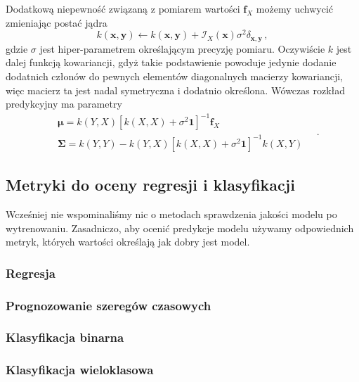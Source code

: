 \documentclass{myclass}
\numberwithin{equation}{section}
\begin{document}
Dodatkową niepewność związaną z pomiarem wartości \(\mathbf{f}_X\) możemy uchwycić zmieniając postać
jądra 
\begin{equation}
    k(\mathbf{x},\mathbf{y}) \leftarrow k(\mathbf{x},\mathbf{y}) + \mathcal{I}_X(\mathbf{x})\sigma^2\delta_{\mathbf{x},\mathbf{y}}\,,
\end{equation}
gdzie \(\sigma\) jest hiper-parametrem określającym precyzję pomiaru. Oczywiście \(k\) jest dalej
funkcją kowariancji, gdyż takie podstawienie powoduje jedynie dodanie dodatnich członów do pewnych
elementów diagonalnych macierzy kowariancji, więc macierz ta jest nadal symetryczna i dodatnio
określona. Wówczas rozkład predykcyjny ma parametry
\begin{equation}
    \begin{split}
        &\boldsymbol{\mu} = k(Y,X)\left[k(X,X) + \sigma^2\mathbf{1}\right]^{-1}\mathbf{f}_X\\
        &\mathbf{\Sigma} = k(Y,Y) - k(Y,X)\left[k(X,X) + \sigma^2\mathbf{1}\right]^{-1}k(X,Y)
    \end{split}\quad.
\end{equation}


\subsection{Metryki do oceny regresji i klasyfikacji}

Wcześniej nie wspominaliśmy nic o metodach sprawdzenia jakości modelu po wytrenowaniu. Zasadniczo,
aby ocenić predykcje modelu używamy odpowiednich metryk, których wartości określają jak dobry jest
model.


\subsubsection{Regresja}

\subsubsection{Prognozowanie szeregów czasowych}

\subsubsection{Klasyfikacja binarna}

\subsubsection{Klasyfikacja wieloklasowa}
\end{document}
